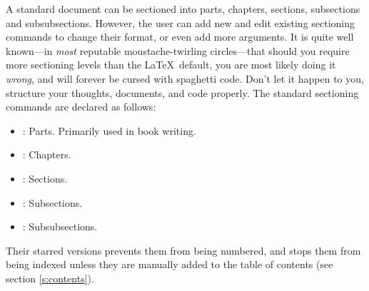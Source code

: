 A standard document can be sectioned into parts, chapters, sections,
subsections and subsubsections.  However, the user can add new and
edit existing sectioning commands to change their format, or even add
more arguments.  It is quite well known---in \emph{most} reputable
moustache-twirling circles---that should you require more sectioning
levels than the \LaTeX~default, you are most likely doing it
\emph{wrong}, and will forever be cursed with spaghetti code.  Don't
let it happen to you, structure your thoughts, documents, and code
properly.  The standard sectioning commands are declared as follows:
\begin{itemize}
\item {}: Parts. Primarily used in book writing.
\item {}: Chapters.
\item {}: Sections.
\item {}: Subsections.
\item {}: Subsubsections.
\end{itemize}
%
Their starred versions prevents them from being numbered, and stops
them from being indexed unless they are manually added to the table of
contents (see section \ref{s:contents}).
